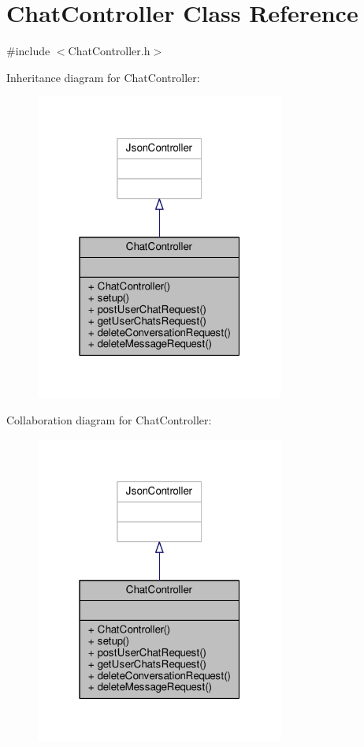 \hypertarget{classChatController}{}\section{Chat\+Controller Class Reference}
\label{classChatController}


{\ttfamily \#include $<$Chat\+Controller.\+h$>$}



Inheritance diagram for Chat\+Controller\+:\nopagebreak
\begin{figure}[H]
\begin{center}
\leavevmode
\includegraphics[width=232pt]{da/d87/classChatController__inherit__graph}
\end{center}
\end{figure}


Collaboration diagram for Chat\+Controller\+:\nopagebreak
\begin{figure}[H]
\begin{center}
\leavevmode
\includegraphics[width=232pt]{d9/da9/classChatController__coll__graph}
\end{center}
\end{figure}
